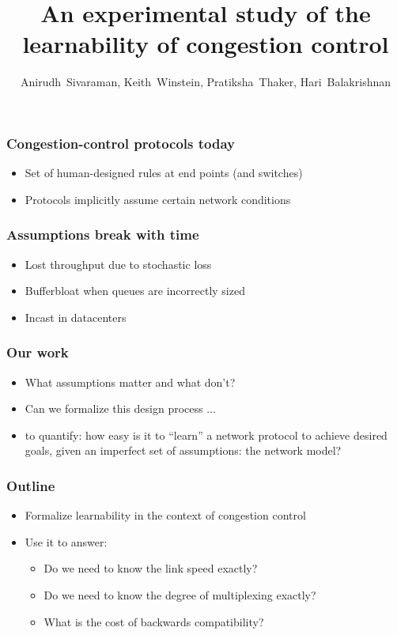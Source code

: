 \documentclass[svgnames]{beamer}
\title{An experimental study of the learnability of congestion control}
\author{Anirudh~Sivaraman, Keith~Winstein, Pratiksha~Thaker, Hari~Balakrishnan}
\institute{MIT CSAIL\vspace{\baselineskip}}
\begin{document}
\begin{frame}

\titlepage

\end{frame}

\begin{Large}
\begin{frame}
\frametitle{Congestion-control protocols today}
\begin{itemize}
\item<2-> Set of human-designed rules at end points (and switches)
\item<3-> Protocols implicitly assume certain network conditions
\end{itemize}
\end{frame}

\begin{frame}
\frametitle{Assumptions break with time}
\begin{itemize}
\item Lost throughput due to stochastic loss 
\item Bufferbloat when queues are incorrectly sized
\item Incast in datacenters
\end{itemize}
\end{frame}

\begin{frame}
\frametitle{Our work}
\begin{itemize}
\item<1-> What assumptions matter and what don't?
\item<2-> Can we formalize this design process ...
\item<3-> to quantify: how easy is it to “learn” a network protocol to achieve desired goals, given
an imperfect set of assumptions: the network model?
\end{itemize}
\end{frame}

\begin{frame}
\frametitle{Outline}
\begin{itemize}
\item Formalize learnability in the context of congestion control
\item Use it to answer:
\begin{itemize}
\item Do we need to know the link speed exactly?
\item Do we need to know the degree of multiplexing exactly?
\item What is the cost of backwards compatibility?
\end{itemize}
\end{itemize}
\end{frame}


\end{Large}
\end{document}
